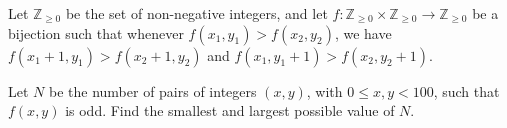 Let $\mathbb{Z}_{\geq 0}$ be the set of non-negative integers, and let $f : \mathbb{Z}_{\geq 0} \times \mathbb{Z}_{\geq 0} \to \mathbb{Z}_{\geq 0}$ be a bijection such that whenever $f(x_1, y_1) > f(x_2, y_2)$, we have $f(x_1 + 1, y_1) > f(x_2 + 1, y_2)$ and $f(x_1, y_1 + 1) > f(x_2, y_2 + 1)$.

Let $N$ be the number of pairs of integers $(x, y)$, with $0 \leq x, y < 100$, such that $f(x, y)$ is odd. Find the smallest and largest possible value of $N$.
